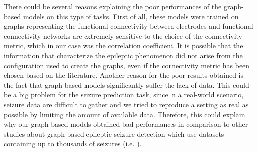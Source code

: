 There could be several reasons explaining the poor performances of the graph-based models on this type of tasks. First of all, these models were trained on graphs representing the functional connectivity between electrodes and functional connectivity networks are extremely sensitive to the choice of the connectivity metric, which in our case was the correlation coefficient. It is possible that the information that characterize the epileptic phenomenon did not arise from the configuration used to create the graphs, even if the connectivity metric has been chosen based on the literature. Another reason for the poor results obtained is the fact that graph-based models significantly suffer the lack of data. This could be a big problem for the seizure prediction task, since in a real-world scenario, seizure data are difficult to gather and we tried to reproduce a setting as real as possible by limiting the amount of available data. Therefore, this could explain why our graph-based models obtained bad performances in comparison to other studies about graph-based epileptic seizure detection which use datasets containing up to thousands of seizures (i.e. \cite{arXiv:graphseizuredet}).
